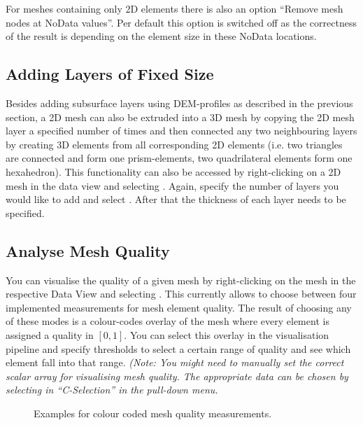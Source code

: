 For meshes containing only 2D elements there is also an option ``Remove mesh nodes at NoData values''. Per default this option is switched off as the correctness of the result is depending on the element size in these NoData locations.

\subsection{Adding Layers of Fixed Size}
\label{fixedsizelayers}

Besides adding subsurface layers using DEM-profiles as described in the previous section, a 2D mesh can also be extruded into a 3D mesh by copying the 2D mesh layer a specified number of times and then connected any two neighbouring layers by creating 3D elements from all corresponding 2D elements (i.e. two triangles are connected and form one prism-elements, two quadrilateral elements form one hexahedron). This functionality can also be accessed by right-clicking on a 2D mesh in the data view and selecting . Again, specify the number of layers you would like to add and select . After that the thickness of each layer needs to be specified.

\subsection{Analyse Mesh Quality}

You can visualise the quality of a given mesh by right-clicking on the mesh in the respective Data View and selecting . This currently allows to choose between four implemented measurements for mesh element quality. The result of choosing any of these modes is a colour-codes overlay of the mesh where every element is assigned a quality in $[0,1]$. You can select this overlay in the visualisation pipeline and specify thresholds to select a certain range of quality and see which element fall into that range. \emph{(Note: You might need to manually set the correct scalar array for visualising mesh quality. The appropriate data can be chosen by selecting in ``C-Selection'' in the  pull-down menu.}

\begin{figure}[tb]
\begin{center}
\enspace
{}\enspace
{}
\end{center}
\caption{Examples for colour coded mesh quality measurements.} \label{fig:mshqual}
\end{figure}

